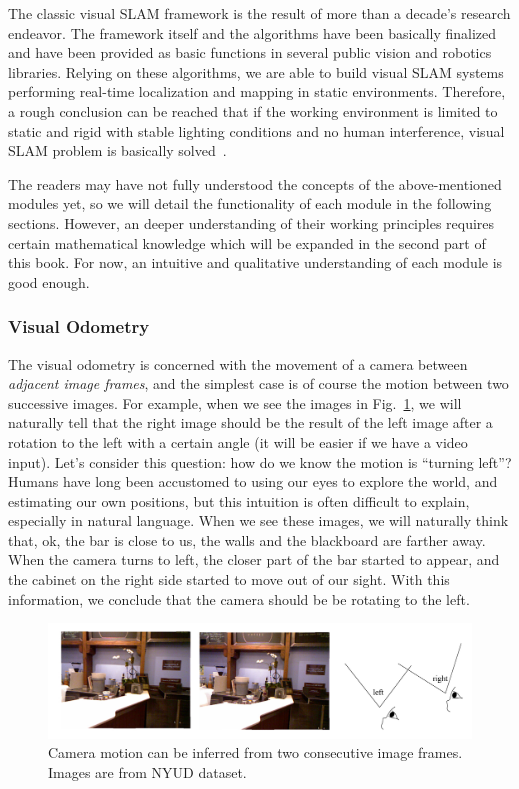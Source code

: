 The classic visual SLAM framework is the result of more than a decade's research endeavor. The framework itself and the algorithms have been basically finalized and have been provided as basic functions in several public vision and robotics libraries. Relying on these algorithms, we are able to build visual SLAM systems performing real-time localization and mapping in static environments. Therefore, a rough conclusion can be reached that if the working environment is limited to static and rigid with stable lighting conditions and no human interference, visual SLAM problem is basically solved~\cite{Cadena2016}.

The readers may have not fully understood the concepts of the above-mentioned modules yet, so we will detail the functionality of each module in the following sections. However, an deeper understanding of their working principles requires certain mathematical knowledge which will be expanded in the second part of this book. For now, an intuitive and qualitative understanding of each module is good enough.

\subsubsection{Visual Odometry}

The visual odometry is concerned with the movement of a camera between \emph{adjacent image frames}, and the simplest case is of course the motion between two successive images. For example, when we see the images in Fig.~\ref{fig:cameramotion}, we will naturally tell  that the right image should be the result of the left image after a rotation to the left with a certain angle (it will be easier if we have a video input). Let's consider this question: how do we know the motion is ``turning left''? Humans have long been accustomed to using our eyes to explore the world, and estimating our own positions, but this intuition is often difficult to explain, especially in natural language. When we see these images, we will naturally think that, ok, the bar is close to us, the walls and the blackboard are farther away. When the camera turns to left, the closer part of the bar started to appear, and the cabinet on the right side started to move out of our sight. With this information, we conclude that the camera should be be rotating to the left.

\begin{figure}
    \centering
    \includegraphics[width=1.0\textwidth]{./resources/whatIsSLAM/cameramotion.pdf}
    \caption{Camera motion can be inferred from two consecutive image frames. Images are from NYUD dataset.}
    \label{fig:cameramotion}
\end{figure}

